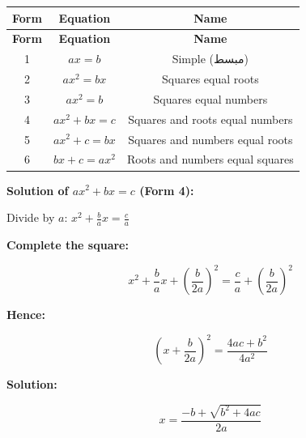 \documentclass[11pt,a4paper]{article}
\newenvironment{mathalgo}{%

  \par\vspace{0.3cm}

  \begin{framed}

  \setlength{\parindent}{0pt}

}{%

  \end{framed}

  \par\vspace{0.3cm}

}
\newcommand{\ar}[1]{{\arabicfont\beginR #1\endR}}
\begin{document}
\begin{longtable}{|c|c|c|}

\hline

\textbf{Form} & \textbf{Equation} & \textbf{Name} \\

\hline

\endfirsthead

\hline

\textbf{Form} & \textbf{Equation} & \textbf{Name} \\

\hline

\endhead

1 & $ax = b$ & Simple (\ar{مبسط}) \\

\hline

2 & $ax^2 = bx$ & Squares equal roots \\

\hline

3 & $ax^2 = b$ & Squares equal numbers \\

\hline

4 & $ax^2 + bx = c$ & Squares and roots equal numbers \\

\hline

5 & $ax^2 + c = bx$ & Squares and numbers equal roots \\

\hline

6 & $bx + c = ax^2$ & Roots and numbers equal squares \\

\hline

\end{longtable}



\begin{mathalgo}

\textbf{Solution of $ax^2 + bx = c$ (Form 4):}



Divide by $a$: $x^2 + \frac{b}{a}x = \frac{c}{a}$



\textbf{Complete the square:}

\[

x^2 + \frac{b}{a}x + \left(\frac{b}{2a}\right)^2 = \frac{c}{a} +

\left(\frac{b}{2a}\right)^2

\]



\textbf{Hence:}

\[

\left(x + \frac{b}{2a}\right)^2 = \frac{4ac + b^2}{4a^2}

\]



\textbf{Solution:}

\[

x = \frac{-b + \sqrt{b^2 + 4ac}}{2a}

\]

\end{mathalgo}
\end{document}
